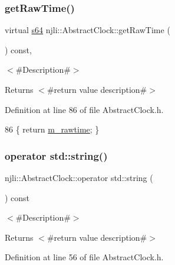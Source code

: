 \subsubsection{\texorpdfstring{get\+Raw\+Time()}{getRawTime()}}
{\footnotesize\ttfamily virtual \mbox{\hyperlink{_util_8h_a4258bfb2c3a440d06c4aaa3c2b450dde}{s64}} njli\+::\+Abstract\+Clock\+::get\+Raw\+Time (\begin{DoxyParamCaption}{ }\end{DoxyParamCaption}) const\hspace{0.3cm}{\ttfamily [inline]}, {\ttfamily [virtual]}}

$<$\#\+Description\#$>$

\begin{DoxyReturn}{Returns}
$<$\#return value description\#$>$ 
\end{DoxyReturn}


Definition at line 86 of file Abstract\+Clock.\+h.


\begin{DoxyCode}
86 \{ \textcolor{keywordflow}{return} \mbox{\hyperlink{classnjli_1_1_abstract_clock_a668e9ea61bf8c76643255af6b65f2a59}{m\_rawtime}}; \}
\end{DoxyCode}
\mbox{\label{classnjli_1_1_abstract_clock_a95ea44479f55856a0b356edc5a2ad111}} 
\subsubsection{\texorpdfstring{operator std\+::string()}{operator std::string()}}
{\footnotesize\ttfamily njli\+::\+Abstract\+Clock\+::operator std\+::string (\begin{DoxyParamCaption}{ }\end{DoxyParamCaption}) const\hspace{0.3cm}{\ttfamily [inline]}}

$<$\#\+Description\#$>$

\begin{DoxyReturn}{Returns}
$<$\#return value description\#$>$ 
\end{DoxyReturn}


Definition at line 56 of file Abstract\+Clock.\+h.


